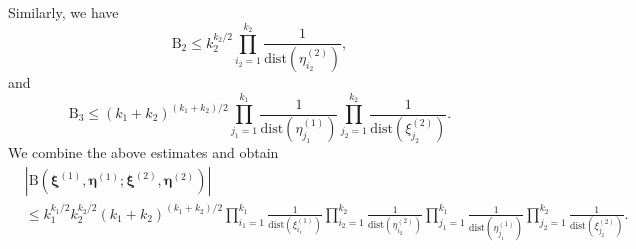 \documentclass{article}
\numberwithin{equation}{section}
\newcommand{\dg}{\mathrm{dist}}
\begin{document}
Similarly, we have
\begin{equation*}
	\mathrm{B}_2 \le k_2^{k_2/2} \prod_{i_2=1}^{k_2}\frac{1}{\dg(\eta_{i_2}^{(2)})},
\end{equation*}
and
\begin{equation*}
	\mathrm{B}_3 \le (k_1+k_2)^{(k_1+k_2)/2}\prod_{j_1=1}^{k_1}\frac{1}{\dg(\eta_{j_1}^{(1)})}\prod_{j_2=1}^{k_2}\frac{1}{\dg(\xi_{j_2}^{(2)})}.
\end{equation*}
We combine the above estimates and obtain
\begin{equation}
	\label{eq:aux_12}
	\begin{split}
		&\left|\mathrm{B}(\boldsymbol{\xi}^{(1)},\boldsymbol{\eta}^{(1)};\boldsymbol{\xi}^{(2)},\boldsymbol{\eta}^{(2)})\right|\\
		& \le k_1^{k_1/2}k_2^{k_2/2}(k_1+k_2)^{(k_1+k_2)/2}\prod_{i_1=1}^{k_1}\frac{1}{\dg(\xi_{i_1}^{(1)})}\prod_{i_2=1}^{k_2}\frac{1}{\dg(\eta_{i_2}^{(2)})}\prod_{j_1=1}^{k_1}\frac{1}{\dg(\eta_{j_1}^{(1)})}\prod_{j_2=1}^{k_2}\frac{1}{\dg(\xi_{j_2}^{(2)})}.
	\end{split}
\end{equation}
\end{document}
